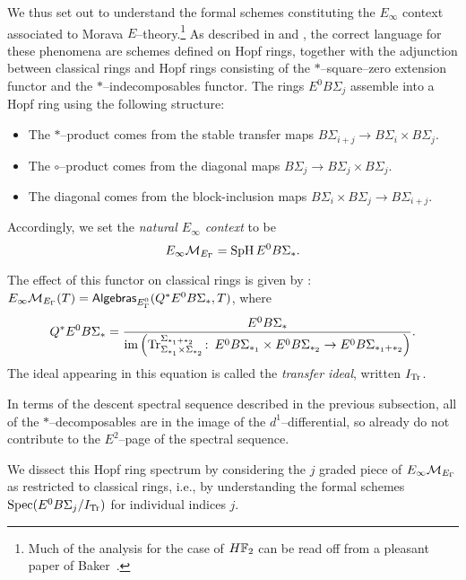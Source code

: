 We thus set out to understand the formal schemes constituting the $E_\infty$ context associated to Morava $E$--theory.\footnote{Much of the analysis for the case of $\HFtwo$ can be read off from a pleasant paper of Baker~\cite{Baker}.}  As described in  and , the correct language for these phenomena are schemes defined on Hopf rings, together with the adjunction between classical rings and Hopf rings consisting of the $\ast$--square--zero extension functor and the $\ast$--indecomposables functor.  The rings $E^0 B\Sigma_j$ assemble into a Hopf ring using the following structure:
\begin{itemize}
    \item The $\ast$--product comes from the stable transfer maps $B\Sigma_{i+j} \to B\Sigma_i \times B\Sigma_j$.
    \item The $\circ$--product comes from the diagonal maps $B\Sigma_j \to B\Sigma_j \times B\Sigma_j$.
    \item The diagonal comes from the block-inclusion maps $B\Sigma_i \times B\Sigma_j \to B\Sigma_{i+j}$.
\end{itemize}

\begin{definition}
Accordingly, we set the \textit{natural $E_\infty$ context} to be \[E_\infty\mathcal{M}_{E_\Gamma} = \operatorname{SpH} E^0 B\Sigma_*.\]
\end{definition}

The effect of this functor on classical rings is given by : $E_\infty\mathcal{M}_{E_\Gamma}(T) = \mathsf{Algebras}_{E_\Gamma^0}(Q^* E^0 B\Sigma_*, T)$, where \[Q^* E^0 B\Sigma_* = \frac{E^0 B\Sigma_*}{\operatorname{im}\left(\mathrm{Tr}_{\Sigma_{*_1} \times \Sigma_{*_2}}^{\Sigma_{*_1 + *_2}}\colon\thinspace E^0 B\Sigma_{*_1} \times E^0 B\Sigma_{*_2} \to E^0 B\Sigma_{*_1 + *_2}\right)}.\]  The ideal appearing in this equation is called the \textit{transfer ideal}, written $I_{\mathrm{Tr}}$.

\begin{remark}
In terms of the descent spectral sequence described in the previous subsection, all of the $*$--decomposables are in the image of the $d^1$--differential, so already do not contribute to the $E^2$--page of the spectral sequence.
\end{remark}

We dissect this Hopf ring spectrum by considering the $j${\th} graded piece of $E_\infty\mathcal{M}_{E_\Gamma}$ as restricted to classical rings, i.e., by understanding the formal schemes $\operatorname{Spec} (E^0 B\Sigma_j / I_{\mathrm{Tr}})$ for individual indices $j$.

